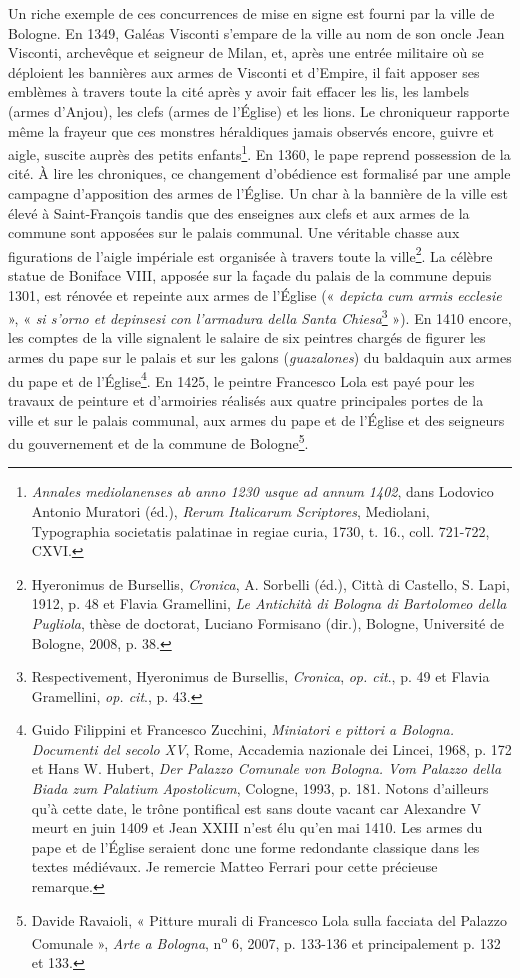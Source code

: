 \documentclass[12pt,twoside,openany]{book}
\begin{document}
Un riche exemple de ces concurrences de mise en signe est fourni par la ville de Bologne. En 1349, Galéas Visconti s’empare de la ville au nom de son oncle Jean Visconti, archevêque et seigneur de Milan, et, après une entrée militaire où se déploient les bannières aux armes de Visconti et d’Empire, il fait apposer ses emblèmes à travers toute la cité après y avoir fait effacer les lis, les lambels (armes d’Anjou), les clefs (armes de l’Église) et les lions. Le chroniqueur rapporte même la frayeur que ces monstres héraldiques jamais observés encore, guivre et aigle, suscite auprès des petits enfants\footnote{\textit{Annales mediolanenses ab anno 1230 usque ad annum 1402}, dans Lodovico Antonio Muratori (éd.), \textit{Rerum Italicarum Scriptores}, Mediolani, Typographia societatis palatinae in regiae curia, 1730, t. 16., coll. 721-722, CXVI.}. En 1360, le pape reprend possession de la cité. À lire les chroniques, ce changement d’obédience est formalisé par une ample campagne d’apposition des armes de l’Église. Un char à la bannière de la ville est élevé à Saint-François tandis que des enseignes aux clefs et aux armes de la commune sont apposées sur le palais communal. Une véritable chasse aux figurations de l’aigle impériale est organisée à travers toute la ville\footnote{Hyeronimus de Bursellis, \textit{Cronica}, A. Sorbelli (éd.), Città di Castello, S. Lapi, 1912, p. 48 et Flavia Gramellini, \textit{Le Antichità di Bologna di Bartolomeo della Pugliola}, thèse de doctorat, Luciano Formisano (dir.), Bologne, Université de Bologne, 2008, p. 38.}. La célèbre statue de Boniface VIII, apposée sur la façade du palais de la commune depuis 1301, est rénovée et repeinte aux armes de l’Église (« \textit{depicta cum armis ecclesie} », « \textit{si s’orno et depinsesi con l’armadura della Santa Chiesa}\footnote{Respectivement, Hyeronimus de Bursellis, \textit{Cronica}, \textit{op. cit}., p. 49 et Flavia Gramellini, \textit{op. cit}., p. 43.} »). En 1410 encore, les comptes de la ville signalent le salaire de six peintres chargés de figurer les armes du pape sur le palais et sur les galons (\textit{guazalones}) du baldaquin aux armes du pape et de l’Église\footnote{Guido Filippini et Francesco Zucchini,\textit{ Miniatori e pittori a Bologna. Documenti del secolo XV}, Rome, Accademia nazionale dei Lincei, 1968, p. 172 et Hans W. Hubert, \textit{Der Palazzo Comunale von Bologna. Vom Palazzo della Biada zum Palatium Apostolicum}, Cologne, 1993, p. 181. Notons d’ailleurs qu’à cette date, le trône pontifical est sans doute vacant car Alexandre V meurt en juin 1409 et Jean XXIII n’est élu qu’en mai 1410. Les armes du pape et de l’Église seraient donc une forme redondante classique dans les textes médiévaux. Je remercie Matteo Ferrari pour cette précieuse remarque.}. En 1425, le peintre Francesco Lola est payé pour les travaux de peinture et d’armoiries réalisés aux quatre principales portes de la ville et sur le palais communal, aux armes du pape et de l’Église et des seigneurs du gouvernement et de la commune de Bologne\footnote{Davide Ravaioli, « Pitture murali di Francesco Lola sulla facciata del Palazzo Comunale », \textit{Arte a Bologna}, n\textsuperscript{o} 6, 2007, p. 133-136 et principalement p. 132 et 133.}.
\end{document}
